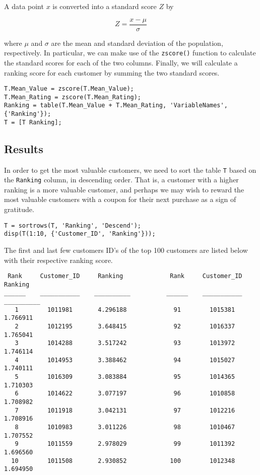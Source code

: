 \noindent
A data point $x$ is converted into a standard score $Z$ by

$$Z = \frac{x - \mu}{\sigma}$$

\noindent
where $\mu$ and $\sigma$ are the mean and standard deviation of the population, respectively. In particular, we can make use of the \lstinline|zscore()| function to calculate the standard scores for each of the two columns. Finally, we will calculate a ranking score for each customer by summing the two standard scores.

\begin{lstlisting}
T.Mean_Value = zscore(T.Mean_Value);
T.Mean_Rating = zscore(T.Mean_Rating);
Ranking = table(T.Mean_Value + T.Mean_Rating, 'VariableNames', {'Ranking'});
T = [T Ranking];
\end{lstlisting}

\subsection{Results}

In order to get the most valuable customers, we need to sort the table \lstinline|T| based on the \lstinline|Ranking| column, in descending order. That is, a customer with a higher ranking is a more valuable customer, and perhaps we may wish to reward the most valuable customers with a coupon for their next purchase as a sign of gratitude.

\begin{lstlisting}
T = sortrows(T, 'Ranking', 'Descend');
disp(T(1:10, {'Customer_ID', 'Ranking'}));
\end{lstlisting}

\noindent
The first and last few customers ID's of the top 100 customers are listed below with their respective ranking score.

\begin{lstlisting}
 Rank     Customer_ID     Ranking             Rank     Customer_ID     Ranking  
______    ___________    __________          ______    ___________    __________
   1        1011981       4.296188             91        1015381       1.766911
   2        1012195       3.648415             92        1016337       1.765041
   3        1014288       3.517242             93        1013972       1.746114
   4        1014953       3.388462             94        1015027       1.740111
   5        1016309       3.083884             95        1014365       1.710303
   6        1014622       3.077197             96        1010858       1.708982
   7        1011918       3.042131             97        1012216       1.708916
   8        1010983       3.011226             98        1010467       1.707552
   9        1011559       2.978029             99        1011392       1.696560
  10        1011508       2.930852            100        1012348       1.694950
\end{lstlisting}

